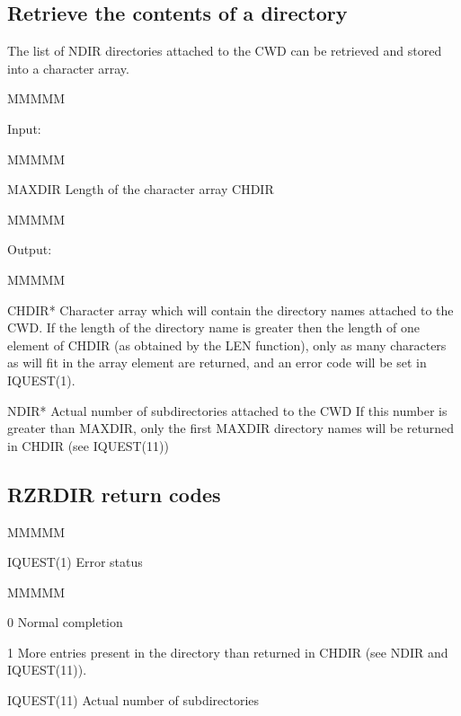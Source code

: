 \subsection{Retrieve the contents of a directory}
\par The list of NDIR directories attached to the CWD can be
retrieved and stored into a character array.
\begin{DL}{MMMMM}
\item[Input:
]
\begin{DL}{MMMMM}
\item[MAXDIR
]Length of the character array CHDIR
\end{DL}
\end{DL}
\begin{DL}{MMMMM}
\item[Output:
]
\begin{DL}{MMMMM}
\item[CHDIR*
]Character array which will contain the directory names attached to
the CWD. If the length of the directory name is greater then the length
of one element of CHDIR (as obtained by the LEN function), only
as many characters as will fit in the array element are returned, and
an error code will be set in IQUEST(1).
\item[NDIR*
]Actual number of subdirectories attached to the CWD
\newline If this number is greater than MAXDIR, only the first MAXDIR
directory names will be returned in CHDIR (see IQUEST(11))
\end{DL}
\end{DL}
\par
\subsection{RZRDIR return codes}
\begin{DL}{MMMMM}
\item[IQUEST(1)
]Error status
\begin{DL}{MMMMM}
\item[0
]Normal completion
\item[1
]More entries present in the directory than returned in CHDIR
(see NDIR and IQUEST(11)).
\end{DL}
\par
\item[IQUEST(11)
]Actual number of subdirectories
\end{DL}

